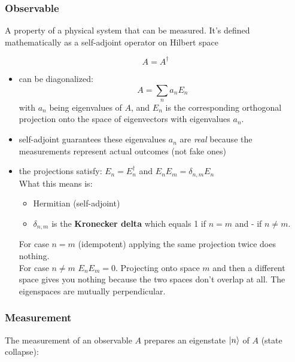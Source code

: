 \documentclass[11pt]{article}
\begin{document}
\subsubsection{Observable}

A property of a physical system that can be measured. It's defined mathematically as a self-adjoint operator on Hilbert space

\begin{equation*}
	A = A^{\dagger}
\end{equation*}

\begin{itemize}
	\item can be diagonalized:
	      \begin{equation*}
		      A = \sum_n a_n E_n
	      \end{equation*}
	      with $a_n$ being eigenvalues of $A$, and $E_n$ is the corresponding orthogonal projection onto the space of eigenvectors with eigenvalues $a_n$.

	\item self-adjoint guarantees these eigenvalues $a_n$ are \textit{real} because the measurements represent actual outcomes (not fake ones)

	\item the projections satisfy: $E_n = E^{\dagger}_n$ and $E_n E_m = \delta_{n,m} E_n$ \\
	      What this means is:
	      \begin{itemize}
		      \item Hermitian (self-adjoint)
		      \item $\delta_{n,m}$ is the \textbf{Kronecker delta} which equals 1 if $n = m$ and - if $n \ne m$.\\
	      \end{itemize}
	      For case $n=m$ (idempotent) applying the same projection twice does nothing.\\
	      For case $n\ne m$ $E_nE_m = 0$. Projecting onto space $m$ and then a different space gives you nothing because the two spaces don't overlap at all. The eigenspaces are mutually perpendicular.
\end{itemize}

\subsubsection{Measurement}

The measurement of an observable $A$ prepares an eigenstate $\ket{n}$ of $A$ (state collapse):
\end{document}
